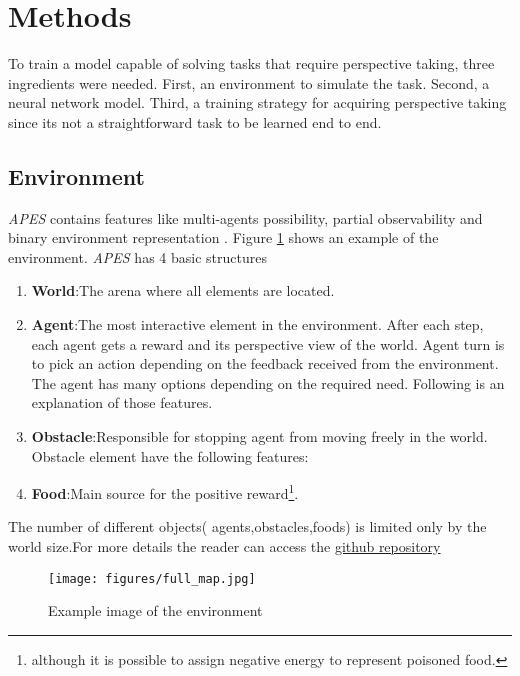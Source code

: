 \documentclass{article}
\begin{document}
\section{Methods}
To train a model capable of solving tasks that require perspective taking, three ingredients were needed. First, an environment to simulate the task. Second, a neural network model. Third, a training strategy for acquiring perspective taking since its not a straightforward task to be learned end to end.
\subsection{Environment}
\textit{APES} contains features like multi-agents possibility, partial observability and binary environment representation \cite{APES}. Figure \ref{fig.env} shows an example of the environment. \textit{APES} has 4 basic structures
\begin{enumerate}
    \item \textbf{World}:The arena where all elements are located.
    \item \textbf{Agent}:The most interactive element in the environment. After each step, each agent gets a reward and its perspective view of the world. Agent turn is to pick an action depending on the feedback received from the environment. The agent has many options depending on the required need. Following is an explanation of those features.
    \item \textbf{Obstacle}:Responsible for stopping agent from moving freely in the world. Obstacle element have the following features:
    \item \textbf{Food}:Main source for the positive reward\footnote{although it is possible to assign negative energy to represent poisoned food.}.
\end{enumerate}
The number of different objects( agents,obstacles,foods) is limited only by the world size.For more details the reader can access the \href{https://github.com/aqeel13932/APES}{github repository}
\begin{figure}[!ht]
\begin{center}
\texttt{[image: figures/full\_map.jpg]}
\caption{Example image of the environment} \label{fig.env}
\end{center}
\end{figure}
\end{document}
